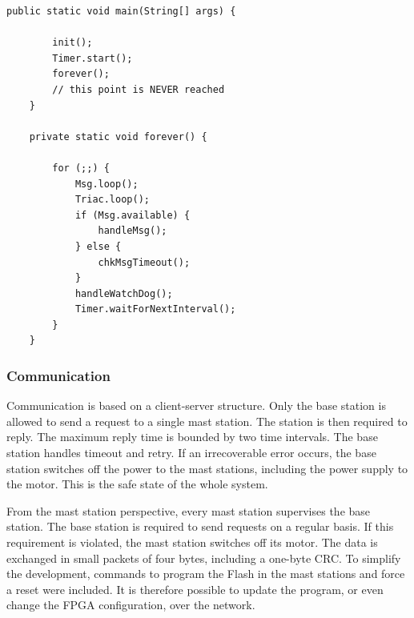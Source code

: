 \begin{lstlisting}[float,caption=Simplified program structure,
label=lst:results:main]
    public static void main(String[] args) {

        init();
        Timer.start();
        forever();
        // this point is NEVER reached
    }

    private static void forever() {

        for (;;) {
            Msg.loop();
            Triac.loop();
            if (Msg.available) {
                handleMsg();
            } else {
                chkMsgTimeout();
            }
            handleWatchDog();
            Timer.waitForNextInterval();
        }
    }
\end{lstlisting}

\subsubsection{Communication}

Communication is based on a client-server structure. Only the base
station is allowed to send a request to a single mast station. The
station is then required to reply. The maximum reply time is bounded
by two time intervals. The base station handles timeout and retry. If
an irrecoverable error occurs, the base station switches off the
power to the mast stations, including the power supply to the motor.
This is the safe state of the whole system.

From the mast station perspective, every mast station supervises the
base station. The base station is required to send requests on a
regular basis. If this requirement is violated, the mast station
switches off its motor. The data is exchanged in small packets of
four bytes, including a one-byte CRC. To simplify the development,
commands to program the Flash in the mast stations and force a reset
were included. It is therefore possible to update the program, or
even change the FPGA configuration, over the network.

